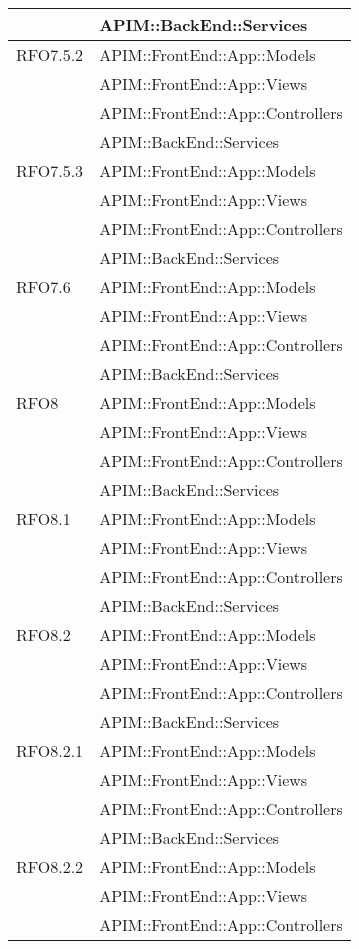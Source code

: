 \begin{longtable}{ p{4cm} | p{12cm} }
			& APIM::BackEnd::Services \\
			\hline		
			RFO7.5.2
			& APIM::FrontEnd::App::Models \\
			& APIM::FrontEnd::App::Views \\
			& APIM::FrontEnd::App::Controllers \\
			& APIM::BackEnd::Services \\
			\hline		
			RFO7.5.3
			& APIM::FrontEnd::App::Models \\
			& APIM::FrontEnd::App::Views \\
			& APIM::FrontEnd::App::Controllers \\
			& APIM::BackEnd::Services \\
			\hline		
			RFO7.6
			& APIM::FrontEnd::App::Models \\
			& APIM::FrontEnd::App::Views \\
			& APIM::FrontEnd::App::Controllers \\
			& APIM::BackEnd::Services \\
			\hline		
			RFO8
			& APIM::FrontEnd::App::Models \\
			& APIM::FrontEnd::App::Views \\
			& APIM::FrontEnd::App::Controllers \\
			& APIM::BackEnd::Services \\
			\hline		
			RFO8.1
			& APIM::FrontEnd::App::Models \\
			& APIM::FrontEnd::App::Views \\
			& APIM::FrontEnd::App::Controllers \\
			& APIM::BackEnd::Services \\
			\hline		
			RFO8.2
			& APIM::FrontEnd::App::Models \\
			& APIM::FrontEnd::App::Views \\
			& APIM::FrontEnd::App::Controllers \\
			& APIM::BackEnd::Services \\
			\hline		
			RFO8.2.1
			& APIM::FrontEnd::App::Models \\
			& APIM::FrontEnd::App::Views \\
			& APIM::FrontEnd::App::Controllers \\
			& APIM::BackEnd::Services \\
			\hline		
			RFO8.2.2
			& APIM::FrontEnd::App::Models \\
			& APIM::FrontEnd::App::Views \\
			& APIM::FrontEnd::App::Controllers \\

\end{longtable}
